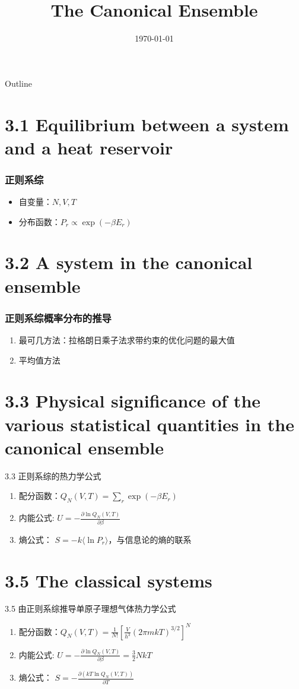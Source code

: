 \documentclass{ctexbeamer}
\title{The Canonical Ensemble}
\date{\today}
\begin{document}
\begin{frame}
	\titlepage
\end{frame}
\begin{frame}{Outline}
    \tableofcontents
\end{frame}
\section{3.1 Equilibrium between 
a system and a heat reservoir
}

\begin{frame}
\frametitle{正则系综}
\begin{itemize}
    \item 自变量：$N,V,T$
    \item 分布函数：$P_r \propto \exp(-\beta E_r)$
\end{itemize}

\end{frame}
\section{3.2 A system in the canonical ensemble
}
\begin{frame}
    \frametitle{正则系综概率分布的推导}
    \begin{enumerate}
        \item 最可几方法：拉格朗日乘子法求带约束的优化问题的最大值
        \item 平均值方法
    \end{enumerate}
    
    \end{frame}
\section{3.3 Physical significance of the various statistical quantities in
the canonical ensemble}
\begin{frame}{3.3 正则系综的热力学公式}
    \begin{enumerate}
        \item 配分函数：$Q_N(V,T) = \sum_{r} \exp(- \beta E_r)$
        \item 内能公式: $U=-\frac{\partial \ln Q_N(V,T)}{\partial \beta}$
        \item 熵公式： $S=-k\langle \ln P_r \rangle$，与信息论的熵的联系
    \end{enumerate}
\end{frame}
\section{3.5 The classical systems}
\begin{frame}{3.5 由正则系综推导单原子理想气体热力学公式}
    \begin{enumerate}
        \item 配分函数：$Q_N(V,T) = \frac{1}{N!} \left[ \frac{V}{h^3}(2\pi mkT)^{3/2} \right]^N$
        \item 内能公式: $U=-\frac{\partial \ln Q_N(V,T)}{\partial \beta}=\frac{3}{2}NkT$
        \item 熵公式： $S=-\frac{ \partial (kT \ln Q_N(V,T))}
        { \partial T}$
    \end{enumerate}
\end{frame}
\end{document}
